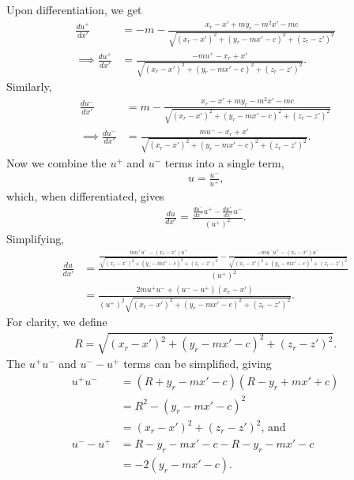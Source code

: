 Upon differentiation, we get
\begin{align}
    \frac{du^+}{dx'} &= -m-\frac{x_r-x'+my_r-m^2x'-mc}{\sqrt{\left(x_r-x'\right)^2+\left(y_r-mx'-c\right)^2+\left(z_r-z'\right)^2}} \nonumber \\
    \implies \frac{du^+}{dx'} &= \frac{-mu^+ - x_r+x'}{\sqrt{\left(x_r-x'\right)^2+\left(y_r-mx'-c\right)^2+\left(z_r-z'\right)^2}} \text{.}
\end{align}
Similarly,
\begin{align}
    \frac{du^-}{dx'} &= m - \frac{x_r-x'+my_r-m^2x'-mc}{\sqrt{\left(x_r-x'\right)^2+\left(y_r-mx'-c\right)^2+\left(z_r-z'\right)^2}} \nonumber \\
    \implies \frac{du^-}{dx'} &= \frac{mu^- - x_r + x'}{\sqrt{\left(x_r-x'\right)^2+\left(y_r-mx'-c\right)^2+\left(z_r-z'\right)^2}} \text{.}
\end{align}
Now we combine the \(u^+\) and \(u^-\) terms into a single term,
\begin{align}
    u = \frac{u^-}{u^+} \text{,}
\end{align}
which, when differentiated, gives
\begin{align}
    \frac{du}{dx'} = \frac{\frac{du^-}{dx'}u^+ - \frac{du^+}{dx'}u^-}{\left(u^+\right)^2} \text{.}
\end{align}
Simplifying,
\begin{align}
    \frac{du}{dx'} &= \frac{\frac{mu^+u^- - \left(x_r-x'\right)u^+}{\sqrt{\left(x_r-x'\right)^2+\left(y_r-mx'-c\right)^2+\left(z_r-z'\right)^2}}-\frac{-mu^-u^+-\left(x_r-x'\right)u^-}{\sqrt{\left(x_r-x'\right)^2+\left(y_r-mx'-c\right)^2+\left(z_r-z'\right)^2}}}{\left(u^+\right)^2} \nonumber \\
    &= \frac{2mu^+u^- + \left(u^--u^+\right)\left(x_r-x'\right)}{\left(u^+\right)^2\sqrt{\left(x_r-x'\right)^2+\left(y_r-mx'-c\right)^2+\left(z_r-z'\right)^2}} \text{.}
\end{align}
For clarity, we define
\begin{align}
    R = \sqrt{\left(x_r-x'\right)^2+\left(y_r-mx'-c\right)^2+\left(z_r-z'\right)^2} \text{.} \nonumber
\end{align}
The \(u^+u^-\) and \(u^--u^+\) terms can be simplified, giving
\begin{align}
    u^+u^- &= \left(R+y_r-mx'-c\right)\left(R-y_r+mx'+c\right) \nonumber \\
    &= R^2 - \left(y_r-mx'-c\right)^2 \nonumber \\
    &= \left(x_r-x'\right)^2 + \left(z_r-z'\right)^2 \text{, and} \nonumber \\
    u^--u^+ &= R - y_r-mx'-c - R - y_r-mx'-c \nonumber \\
    &= -2\left(y_r-mx'-c\right) \text{.} \nonumber
\end{align}
